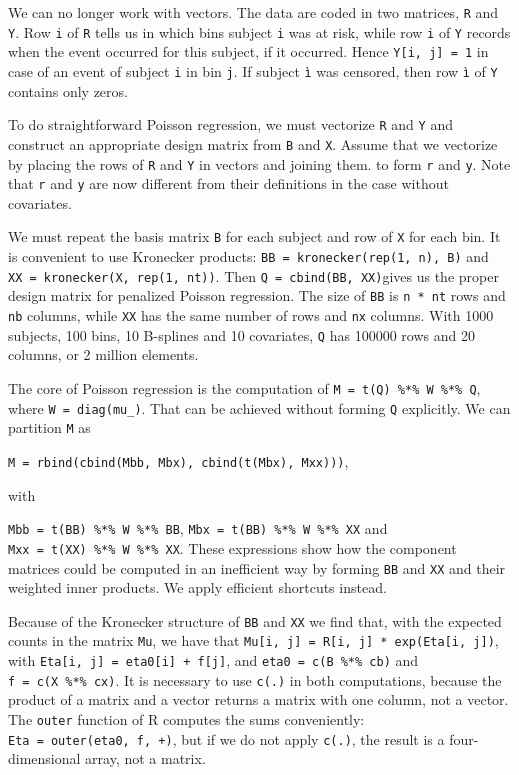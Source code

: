 \documentclass[
  letterpaper,
  DIV=11,
  numbers=noendperiod]{scrartcl}
\begin{document}
We can no longer work with vectors. The data are coded in two matrices,
\texttt{R} and \texttt{Y}. Row \texttt{i} of \texttt{R} tells us in
which bins subject \texttt{i} was at risk, while row \texttt{i} of
\texttt{Y} records when the event occurred for this subject, if it
occurred. Hence \texttt{Y{[}i,\ j{]}\ =\ 1} in case of an event of
subject \texttt{i} in bin \texttt{j}. If subject \texttt{ì} was
censored, then row \texttt{ì} of \texttt{Y} contains only zeros.

To do straightforward Poisson regression, we must vectorize \texttt{R}
and \texttt{Y} and construct an appropriate design matrix from
\texttt{B} and \texttt{X}. Assume that we vectorize by placing the rows
of \texttt{R} and \texttt{Y} in vectors and joining them. to form
\texttt{r} and \texttt{y}. Note that \texttt{r} and \texttt{y} are now
different from their definitions in the case without covariates.

We must repeat the basis matrix \texttt{B} for each subject and row of
\texttt{X} for each bin. It is convenient to use Kronecker products:
\texttt{BB\ =\ kronecker(rep(1,\ n),\ B)} and
\texttt{XX\ =\ kronecker(X,\ rep(1,\ nt))}. Then
\texttt{Q\ =\ cbind(BB,\ XX)}gives us the proper design matrix for
penalized Poisson regression. The size of \texttt{BB} is
\texttt{n\ *\ nt} rows and \texttt{nb} columns, while \texttt{XX} has
the same number of rows and \texttt{nx} columns. With 1000 subjects, 100
bins, 10 B-splines and 10 covariates, \texttt{Q} has 100000 rows and 20
columns, or 2 million elements.

The core of Poisson regression is the computation of
\texttt{M\ =\ t(Q)\ \%*\%\ W\ \%*\%\ Q}, where
\texttt{W\ =\ diag(mu\_)}. That can be achieved without forming
\texttt{Q} explicitly. We can partition \texttt{M} as

\texttt{M\ =\ rbind(cbind(Mbb,\ Mbx),\ cbind(t(Mbx),\ Mxx)))},

with

\texttt{Mbb\ =\ t(BB)\ \%*\%\ W\ \%*\%\ BB},
\texttt{Mbx\ =\ t(BB)\ \%*\%\ W\ \%*\%\ XX} and
\texttt{Mxx\ =\ t(XX)\ \%*\%\ W\ \%*\%\ XX}. These expressions show how
the component matrices could be computed in an inefficient way by
forming \texttt{BB} and \texttt{XX} and their weighted inner products.
We apply efficient shortcuts instead.

Because of the Kronecker structure of \texttt{BB} and \texttt{XX} we
find that, with the expected counts in the matrix \texttt{Mu}, we have
that \texttt{Mu{[}i,\ j{]}\ =\ R{[}i,\ j{]}\ *\ exp(Eta{[}i,\ j{]})},
with \texttt{Eta{[}i,\ j{]}\ =\ eta0{[}i{]}\ +\ f{[}j{]}}, and
\texttt{eta0\ =\ c(B\ \%*\%\ cb)} and \texttt{f\ =\ c(X\ \%*\%\ cx)}. It
is necessary to use \texttt{c(.)} in both computations, because the
product of a matrix and a vector returns a matrix with one column, not a
vector. The \texttt{outer} function of R computes the sums conveniently:
\texttt{Eta\ =\ outer(eta0,\ f,\ \textquotesingle{}+\textquotesingle{})},
but if we do not apply \texttt{c(.)}, the result is a four-dimensional
array, not a matrix.
\end{document}
